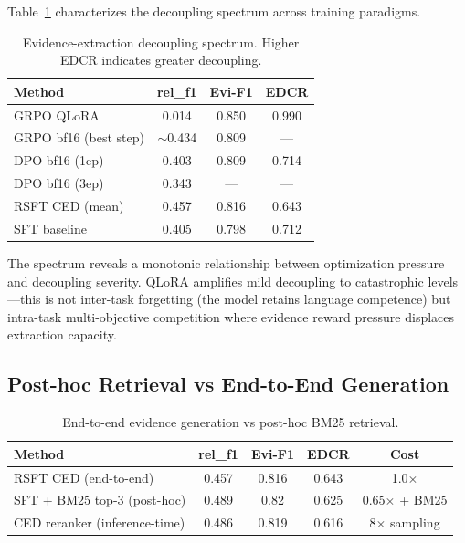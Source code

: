 \documentclass[11pt]{article}
\begin{document}
Table~\ref{tab:decoupling} characterizes the decoupling spectrum across training paradigms.

\begin{table}[h]
\centering
\caption{Evidence-extraction decoupling spectrum. Higher EDCR indicates greater decoupling.}
\label{tab:decoupling}
\begin{tabular}{lccc}
\toprule
\textbf{Method} & \textbf{rel\_f1} & \textbf{Evi-F1} & \textbf{EDCR} \\
\midrule
GRPO QLoRA & 0.014 & 0.850 & 0.990 \\
GRPO bf16 (best step) & $\sim$0.434 & 0.809 & --- \\
DPO bf16 (1ep) & 0.403 & 0.809 & 0.714 \\
DPO bf16 (3ep) & 0.343 & --- & --- \\
RSFT CED (mean) & 0.457 & 0.816 & 0.643 \\
SFT baseline & 0.405 & 0.798 & 0.712 \\
\bottomrule
\end{tabular}
\end{table}

The spectrum reveals a monotonic relationship between optimization pressure and decoupling severity. QLoRA amplifies mild decoupling to catastrophic levels---this is not inter-task forgetting (the model retains language competence) but intra-task multi-objective competition where evidence reward pressure displaces extraction capacity.

\subsection{Post-hoc Retrieval vs End-to-End Generation}
\label{sec:posthoc}

\begin{table}[h]
\centering
\caption{End-to-end evidence generation vs post-hoc BM25 retrieval.}
\label{tab:posthoc}
\begin{tabular}{lcccc}
\toprule
\textbf{Method} & \textbf{rel\_f1} & \textbf{Evi-F1} & \textbf{EDCR} & \textbf{Cost} \\
\midrule
RSFT CED (end-to-end) & 0.457 & 0.816 & 0.643 & 1.0$\times$ \\
SFT + BM25 top-3 (post-hoc) & 0.489 & 0.82 & 0.625 & 0.65$\times$ + BM25 \\
CED reranker (inference-time) & 0.486 & 0.819 & 0.616 & 8$\times$ sampling \\
\bottomrule
\end{tabular}
\end{table}
\end{document}
